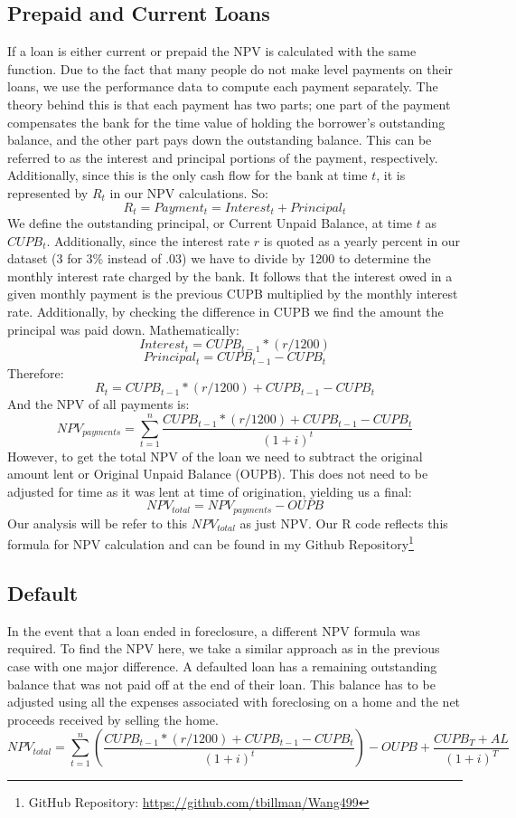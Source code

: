 \documentclass[12 pt]{uncw_thesis}
\theoremstyle{plain}
\theoremstyle{remark}
\theoremstyle{definition}
\begin{document}
\subsection{Prepaid and Current Loans}
If a loan is either current or prepaid the NPV is calculated with the same function. Due to the fact that many people do not make level payments on their loans, we use the performance data to compute each payment separately. The theory behind this is that each payment has two parts; one part of the payment compensates the bank for the time value of holding the borrower's outstanding balance, and the other part pays down the outstanding balance. This can be referred to as the interest and principal portions of the payment, respectively. Additionally, since this is the only cash flow for the bank at time $t$, it is represented by \(R_t\) in our NPV calculations.  So:
\[R_t = Payment_t = Interest_t + Principal_t\]
We define the outstanding principal, or Current Unpaid Balance, at time \(t\) as \(CUPB_t\). Additionally, since the interest rate \(r\) is quoted as a yearly percent in our dataset (3 for 3\% instead of .03) we have to divide by 1200 to determine the monthly interest rate charged by the bank. It follows that the interest owed in a given monthly payment is the previous CUPB multiplied by the monthly interest rate. Additionally, by checking the difference in CUPB we find the amount the principal was paid down. Mathematically:
\[Interest_t = CUPB_{t-1}*(r/1200)\]
\[Principal_t = CUPB_{t-1} - CUPB_{t}\]
Therefore: 
\[R_t = CUPB_{t-1}*(r/1200) + CUPB_{t-1} - CUPB_{t}\]
And the NPV of all payments is:
\[NPV_{payments} = \sum_{t=1}^n \frac{CUPB_{t-1}*(r/1200) + CUPB_{t-1} - CUPB_{t}}{(1+i)^t}\]
However, to get the total NPV of the loan we need to subtract the original amount lent or Original Unpaid Balance (OUPB). This does not need to be adjusted for time as it was lent at time of origination, yielding us a final:
\[NPV_{total} = NPV_{payments} - OUPB\]
Our analysis will be refer to this \(NPV_{total}\) as just NPV. Our R code reflects this formula for NPV calculation and can be found in my Github Repository\footnote{GitHub Repository: \href{https://github.com/tbillman/Wang499}{https://github.com/tbillman/Wang499}}
\subsection{Default}
In the event that a loan ended in foreclosure, a different NPV formula was required. To find the NPV here, we take a similar approach as in the previous case with one major difference. A defaulted loan has a remaining outstanding balance that was not paid off at the end of their loan. This balance has to be adjusted using all the expenses associated with foreclosing on a home and the net proceeds received by selling the home. 
\[NPV_{total} = \sum_{t=1}^n \left( \frac{CUPB_{t-1}*(r/1200) + CUPB_{t-1} - CUPB_{t}}{(1+i)^t}\right) - OUPB + \frac{CUPB_T + AL}{(1+i)^T}\]
\end{document}
